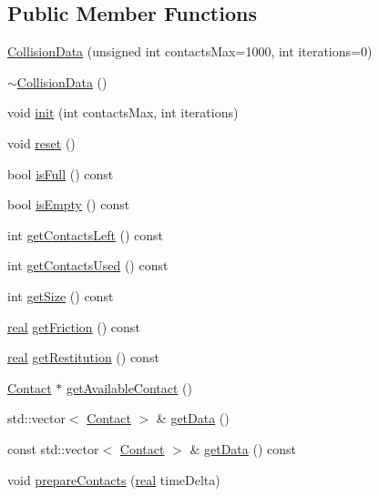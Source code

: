\subsection*{Public Member Functions}
\begin{DoxyCompactItemize}
\item 
\mbox{\hyperlink{classr3_1_1_collision_data_a439100db9ec5b734e2f0b778d2f97cce}{Collision\+Data}} (unsigned int contacts\+Max=1000, int iterations=0)
\item 
\mbox{\hyperlink{classr3_1_1_collision_data_a3fd93aed7add6b43bc6b3dca59d638f2}{$\sim$\+Collision\+Data}} ()
\item 
void \mbox{\hyperlink{classr3_1_1_collision_data_a2af69fd6da492254b1a134d4ef82efce}{init}} (int contacts\+Max, int iterations)
\item 
void \mbox{\hyperlink{classr3_1_1_collision_data_af74822ca6881f5ab54447a73ac26d7fd}{reset}} ()
\item 
bool \mbox{\hyperlink{classr3_1_1_collision_data_aebb099e77b79235942a9c0166eb66a78}{is\+Full}} () const
\item 
bool \mbox{\hyperlink{classr3_1_1_collision_data_a3b97a4828252625e891c939ad7ce0064}{is\+Empty}} () const
\item 
int \mbox{\hyperlink{classr3_1_1_collision_data_a13e8ade4bbbbc63a1437de9371fea879}{get\+Contacts\+Left}} () const
\item 
int \mbox{\hyperlink{classr3_1_1_collision_data_aaf0e65914133cd35cc32224df851561e}{get\+Contacts\+Used}} () const
\item 
int \mbox{\hyperlink{classr3_1_1_collision_data_ad0898e21e34b4558dbdd68dd115c49d8}{get\+Size}} () const
\item 
\mbox{\hyperlink{namespacer3_ab2016b3e3f743fb735afce242f0dc1eb}{real}} \mbox{\hyperlink{classr3_1_1_collision_data_ae610a57c20c504a7bacb4e35f89f530f}{get\+Friction}} () const
\item 
\mbox{\hyperlink{namespacer3_ab2016b3e3f743fb735afce242f0dc1eb}{real}} \mbox{\hyperlink{classr3_1_1_collision_data_a4fa1a70757353fe8ae2facc3762f5b2b}{get\+Restitution}} () const
\item 
\mbox{\hyperlink{classr3_1_1_contact}{Contact}} $\ast$ \mbox{\hyperlink{classr3_1_1_collision_data_ad0e0b85004905b48a8faf7be34bdf305}{get\+Available\+Contact}} ()
\item 
std\+::vector$<$ \mbox{\hyperlink{classr3_1_1_contact}{Contact}} $>$ \& \mbox{\hyperlink{classr3_1_1_collision_data_acb1bb23e8d0f37f0ebc39e8f7642419f}{get\+Data}} ()
\item 
const std\+::vector$<$ \mbox{\hyperlink{classr3_1_1_contact}{Contact}} $>$ \& \mbox{\hyperlink{classr3_1_1_collision_data_ab31745ebb708c1d04e22bcfb385e663f}{get\+Data}} () const
\item 
void \mbox{\hyperlink{classr3_1_1_collision_data_a7a8dcf7d0b2cdd99d9c96dabc2a4fbc9}{prepare\+Contacts}} (\mbox{\hyperlink{namespacer3_ab2016b3e3f743fb735afce242f0dc1eb}{real}} time\+Delta)
\end{DoxyCompactItemize}


